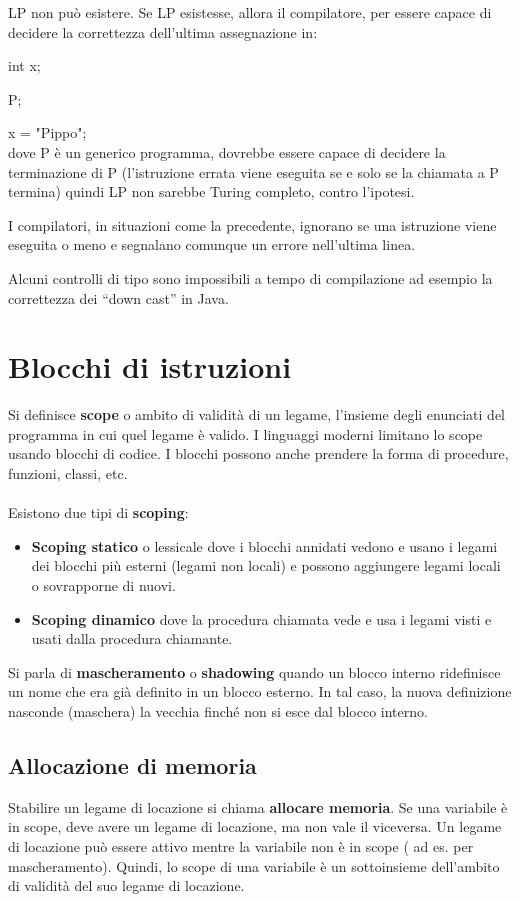 \documentclass[10pt]{article}
\begin{document}
LP non può esistere.
Se LP esistesse, allora il compilatore, per essere capace di decidere la correttezza
dell’ultima assegnazione in:

int x;

P;

x = "Pippo";\\
dove P è un generico programma, dovrebbe essere capace di decidere la terminazione di P (l’istruzione errata viene eseguita se e solo se la chiamata a P termina) quindi LP non sarebbe Turing completo, contro l’ipotesi.

 I compilatori, in situazioni come la precedente, ignorano se una istruzione viene eseguita
o meno e segnalano comunque un errore nell’ultima linea.

Alcuni controlli di tipo sono impossibili a tempo di compilazione ad esempio la correttezza dei “down cast” in Java.
\section{Blocchi di istruzioni}
Si definisce \textbf{scope} o ambito di validità di un legame, l'insieme degli enunciati del programma in cui quel legame è valido.
I linguaggi moderni limitano lo scope usando blocchi di codice.
I blocchi possono anche prendere la forma di procedure, funzioni, classi, etc.\\\\
Esistono due tipi di \textbf{scoping}:
\begin{itemize}
\item 
\textbf{Scoping statico} o lessicale dove i blocchi annidati vedono e usano i legami dei blocchi più esterni (legami non locali) e possono aggiungere legami locali o sovrapporne di nuovi.
\item
\textbf{Scoping dinamico}
dove la procedura chiamata vede e usa i legami visti e usati dalla procedura chiamante.
\end{itemize}
Si parla di \textbf{mascheramento} o \textbf{shadowing} quando un blocco interno ridefinisce un nome che era già definito in un blocco esterno. In tal caso, la nuova definizione nasconde (maschera) la vecchia finché non si esce dal blocco interno.
\subsection{Allocazione di memoria}
Stabilire un legame di locazione si chiama \textbf{allocare memoria}.
Se una variabile è in scope, deve avere un legame di locazione, ma non vale il viceversa.
Un legame di locazione può essere attivo mentre la variabile non è in scope ( ad es. per mascheramento). Quindi, lo scope di una variabile è un sottoinsieme dell'ambito di validità del suo legame di locazione.
\end{document}
